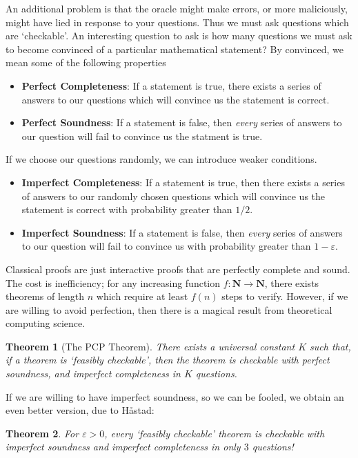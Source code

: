 \documentclass{article}
\theoremstyle{plain}
\newtheorem{theorem}{Theorem}
\theoremstyle{definition}
\begin{document}
An additional problem is that the oracle might make errors, or more maliciously, might have lied in response to your questions. Thus we must ask questions which are `checkable'. An interesting question to ask is how many questions we must ask to become convinced of a particular mathematical statement? By convinced, we mean some of the following properties
%
\begin{itemize}
    \item {\bf Perfect Completeness}: If a statement is true, there exists a series of answers to our questions which will convince us the statement is correct.

    \item {\bf Perfect Soundness}: If a statement is false, then {\it every} series of answers to our question will fail to convince us the statment is true.
\end{itemize}
%
If we choose our questions randomly, we can introduce weaker conditions.
%
\begin{itemize}
    \item {\bf Imperfect Completeness}: If a statement is true, then there exists a series of answers to our randomly chosen questions which will convince us the statement is correct with probability greater than $1/2$.

    \item {\bf Imperfect Soundness}: If a statement is false, then {\it every} series of answers to our question will fail to convince us with probability greater than $1 - \varepsilon$.
\end{itemize}
%
Classical proofs are just interactive proofs that are perfectly complete and sound. The cost is inefficiency; for any increasing function $f: \mathbf{N} \to \mathbf{N}$, there exists theorems of length $n$ which require at least $f(n)$ steps to verify. However, if we are willing to avoid perfection, then there is a magical result from theoretical computing science.

\begin{theorem}[The PCP Theorem]
    There exists a universal constant $K$ such that, if a theorem is `feasibly checkable', then the theorem is checkable with perfect soundness, and imperfect completeness in $K$ questions.
\end{theorem}

If we are willing to have imperfect soundness, so we can be fooled, we obtain an even better version, due to H\r{a}stad:

\begin{theorem}
    For $\varepsilon > 0$, every `feasibly checkable' theorem is checkable with imperfect soundness and imperfect completeness in only $3$ questions!
\end{theorem}
\end{document}
